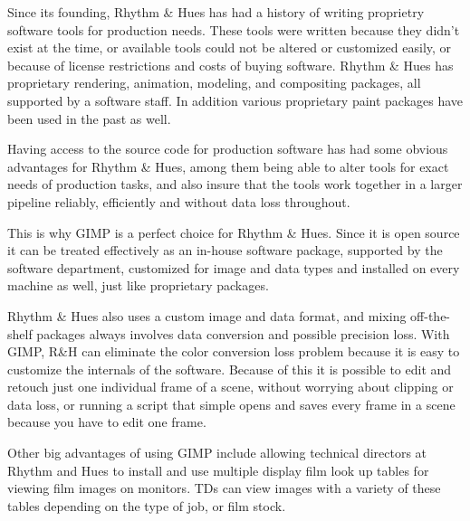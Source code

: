 Since its founding, Rhythm \& Hues has had a history of writing proprietry
software tools for production needs. These tools were written because they
didn't exist at the time, or available tools could not be altered or customized
easily, or because of license restrictions and costs of buying software. Rhythm
\& Hues has proprietary rendering, animation, modeling, and compositing
packages, all supported by a software staff. In addition various proprietary
paint packages have been used in the past as well.

Having access to the source code for production software has had some obvious
advantages for Rhythm \& Hues, among them being able to alter tools for exact
needs of production tasks, and also insure that the tools work together in a
larger pipeline reliably, efficiently and without data loss throughout.

This is why GIMP is a perfect choice for Rhythm \& Hues. Since it is open
source it can be treated effectively as an in-house software package, supported
by the software department, customized for image and data types and installed
on every machine as well, just like proprietary packages.

Rhythm \& Hues also uses a custom image and data format, and mixing
off-the-shelf packages always involves data conversion and possible precision
loss. With GIMP, R\&H can eliminate the color conversion loss problem because
it is easy to customize the internals of the software. Because of this it is
possible to edit and retouch just one individual frame of a scene, without
worrying about clipping or data loss, or running a script that simple opens and
saves every frame in a scene because you have to edit one frame.

Other big advantages of using GIMP include allowing technical directors at
Rhythm and Hues to install and use multiple display film look up tables for
viewing film images on monitors. TDs can view images with a variety of these
tables depending on the type of job, or film stock.
